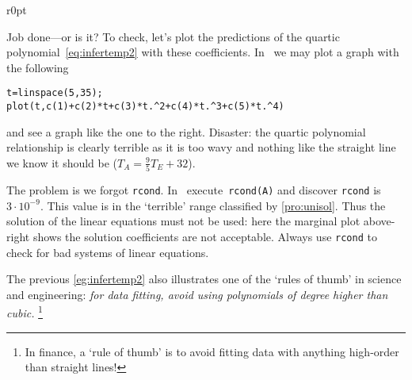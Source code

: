 \begin{example}
\begin{solution}
\begin{wrapfigure}[7]r{0pt}
\end{wrapfigure}
Job done---or is it?
To check, let's plot the predictions of the quartic polynomial~\eqref{eq:infertemp2} with these coefficients.
In \script\ we may plot a graph with the following
\setbox\ajrqrbox\hbox{}%
\marginajrbox%
\begin{verbatim}
t=linspace(5,35);
plot(t,c(1)+c(2)*t+c(3)*t.^2+c(4)*t.^3+c(5)*t.^4)
\end{verbatim}
and see a graph like the one to the right.
Disaster: the quartic polynomial relationship is clearly terrible as it is too wavy and nothing like the straight line we know it should be (\(T_A=\frac95T_E+32\)).

The problem is we forgot \verb|rcond|.
In \script\ execute~\verb|rcond(A)| and discover \verb|rcond| is \(3\cdot10^{-9}\).
This value is in the `terrible' range classified by \cref{pro:unisol}.
Thus the solution of the linear equations must not be used: here the marginal plot above-right shows the solution coefficients are not acceptable.
Always use \verb|rcond| to check for bad systems of linear equations.
\aqed\par
\end{solution}
\end{example}

The previous \cref{eg:infertemp2} also illustrates one of the `rules of thumb' in science and engineering: \emph{for data fitting, avoid using polynomials of degree higher than cubic.}%
\footnote{In finance, a `rule of thumb' is to avoid fitting data with anything high-order than straight lines!}


